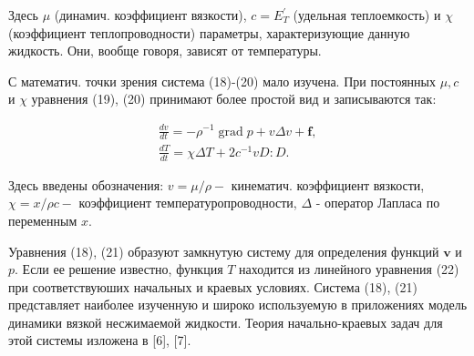 \documentclass[10pt]{article}
\begin{document}
Здесь $\mu$ (динамич. коэффициент вязкости), $c=E_{T}^{\prime}$ (удельная теплоемкость) и $\chi$ (коэффициент теплопроводности) параметры, характеризующие данную жидкость. Они, вообще говоря, зависят от температуры.



С математич. точки зрения система (18)-(20) мало изучена. При постоянных $\mu, c$ и $\chi$ уравнения (19), (20) принимают более простой вид и записываются так:



\[

\begin{gathered}

\frac{d v}{d t}=-\rho^{-1} \operatorname{grad} p+v \Delta v+\boldsymbol{f}, \\

\frac{d T}{d t}=\chi \Delta T+2 c^{-1} v D: D .

\end{gathered}

\]



Здесь введены обозначения: $v=\mu / \rho-$ кинематич. коэффициент вязкости, $\chi=x / \rho c-$ коэффициент температуропроводности, $\Delta$ - оператор Лапласа по переменным $x$.



Уравнения (18), (21) образуют замкнутую систему для определения функций $\boldsymbol{v}$ и $p$. Если ее решение известно, функция $T$ находится из линейного уравнения (22) при соответствуюших начальных и краевых условиях. Система (18), (21) представляет наиболее изученную и широко используемую в приложениях модель динамики вязкой несжимаемой жидкости. Теория начально-краевых задач для этой системы изложена в [6], [7].
\end{document}
